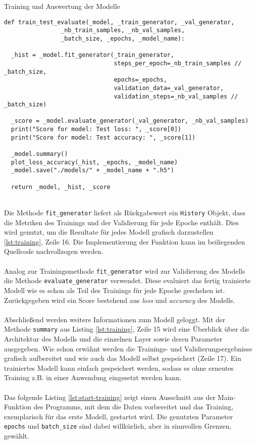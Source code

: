 \begin{listing} [ht]
	\caption{Training und Auswertung der Modelle}
	\label{lst:training}
	\begin{verbatim}
def train_test_evaluate(_model, _train_generator, _val_generator,
				_nb_train_samples, _nb_val_samples,
				_batch_size, _epochs, _model_name):
	
  _hist = _model.fit_generator(_train_generator,
                               steps_per_epoch=_nb_train_samples // _batch_size,
                               epochs=_epochs,
                               validation_data=_val_generator,
                               validation_steps=_nb_val_samples // _batch_size)
	
  _score = _model.evaluate_generator(_val_generator, _nb_val_samples)
  print("Score for model: Test loss: ", _score[0])
  print("Score for model: Test accuracy: ", _score[1])
	
  _model.summary()
  plot_loss_accuracy(_hist, _epochs, _model_name)
  _model.save("./models/" + _model_name + ".h5")
	
  return _model, _hist, _score
	\end{verbatim}
\end{listing} \ \\
%
Die Methode \texttt{fit\_generator} liefert als Rückgabewert ein \texttt{History} Objekt, dass die Metriken des Trainings und der Validierung für jede Epoche enthält. Dies wird genutzt, um die Resultate für jedes Modell grafisch darzustellen \ref{lst:training}, Zeile 16. Die Implementierung der Funktion kann im beiliegenden Quellcode nachvollzogen werden. \\
\\
Analog zur Trainingsmethode \texttt{fit\_generator} wird zur Validierung des Modells die Methode \texttt{evaluate\_generator} verwendet. Diese evaluiert das fertig trainierte Modell wie es schon als Teil des Trainings für jede Epoche geschehen ist. Zurückgegeben wird ein Score bestehend aus \textit{loss} und \textit{accuracy} des Modells. \\ 
\\
Abschließend werden weitere Informationen zum Modell geloggt. Mit der Methode \texttt{summary} aus Listing \ref{lst:training}, Zeile 15 wird eine Überblick über die Architektur des Modells und die einzelnen Layer sowie deren Parameter ausgegeben. Wie schon erwähnt werden die Trainings- und Validierungsergebnisse grafisch aufbereitet und wie auch das Modell selbst gespeichert (Zeile 17). Ein trainiertes Modell kann einfach gespeichert werden, sodass es ohne erneutes Training z.B. in einer Anwendung eingesetzt werden kann. \\
\\
Das folgende Listing \ref{lst:start-training} zeigt einen Ausschnitt aus der Main-Funktion des Programms, mit dem die Daten vorbereitet und das Training, exemplarisch für das erste Modell, gestartet wird. Die genutzten Parameter \texttt{epochs} und \texttt{batch\_size} sind dabei willkürlich, aber in sinnvollen Grenzen, gewählt.

